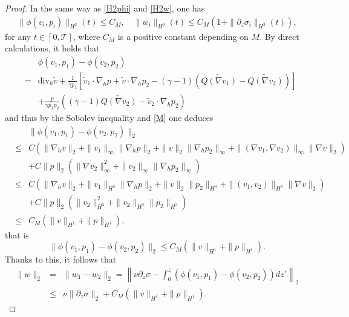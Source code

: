 \documentclass[12pt,reqno]{amsart}
\numberwithin{equation}{section}
\begin{document}
\begin{proof}
  In the same way as \eqref{H2phi} and \eqref{H2w}, one has
  \begin{eqnarray}
    \|\phi(v_i,p_i)\|_{H^2}(t)\leq C_M,\quad \|w_i\|_{H^2}(t)\leq C_M(1+\|\partial_z\sigma_i\|_{H^2}(t)),
\label{H2wphii}
  \end{eqnarray}
  for any $t\in[0,\mathcal T]$, where $C_M$ is a positive constant depending on $M$.
  By direct calculations, it holds that
  \begin{eqnarray*}
    &&\phi(v_1,p_1)-\phi(v_2,p_2)\\
    &=&\text{div}_h\tilde v+\frac{1}{\gamma p_1}\left[\tilde v_1\cdot\nabla_hp
    +\tilde v\cdot\nabla_hp_2-(\gamma-1)\left(\widetilde{Q(\nabla v_1)}-\widetilde{Q(\nabla v_2)}\right)\right]\\
    &&+\frac{p}{\gamma p_1p_2}\left((\gamma-1)\widetilde{Q(\nabla v_2)}-\tilde v_2\cdot\nabla_hp_2\right)
  \end{eqnarray*}
  and thus by the Sobolev inequality and \eqref{M} one deduces
  \begin{eqnarray*}
    &&\|\phi(v_1,p_1)-\phi(v_2,p_2)\|_2\\
    &\leq& C(\|\nabla_hv\|_2+\|v_1\|_\infty\|\nabla_hp\|_2+\|v\|_2\|\nabla_hp_2\|_\infty+\|(\nabla v_1,\nabla v_2)\|_\infty\|\nabla v\|_2)\\
    &&+C\|p\|_2(\|\nabla v_2\|_\infty^2+\|v_2\|_\infty\|\nabla_hp_2\|_\infty)\\
    &\leq& C(\|\nabla_hv\|_2+\|v_1\|_{H^2}\|\nabla_hp\|_2+\|v\|_2\|p_2\|_{H^3}+\|(v_1,v_2)\|_{H^3}\|\nabla v\|_2)\\
    &&+C\|p\|_2(\|v_2\|_{H^3}^2+\|v_2\|_{H^2}\|p_2\|_{H^3})\\
    &\leq &C_M(\|v\|_{H^1}+\|p\|_{H^1}),
  \end{eqnarray*}
  that is
  \begin{equation}
    \|\phi(v_1,p_1)-\phi(v_2,p_2)\|_2\leq C_M(\|v\|_{H^1}+\|p\|_{H^1}). \label{L2Dffphi}
  \end{equation}
  Thanks to this, it follows that
  \begin{eqnarray}
    \|w\|_2&=&\|w_1-w_2\|_2=\left\|\nu\partial_z\sigma-\int_0^z(\phi(v_1,p_1)-\phi(v_2,p_2))dz'\right\|_2\nonumber\\
    &\leq&\nu\|\partial_z\sigma\|_2+C_M(\|v\|_{H^1}+\|p\|_{H^1}).\label{L2Diffw}
  \end{eqnarray}


\end{proof}
\end{document}
